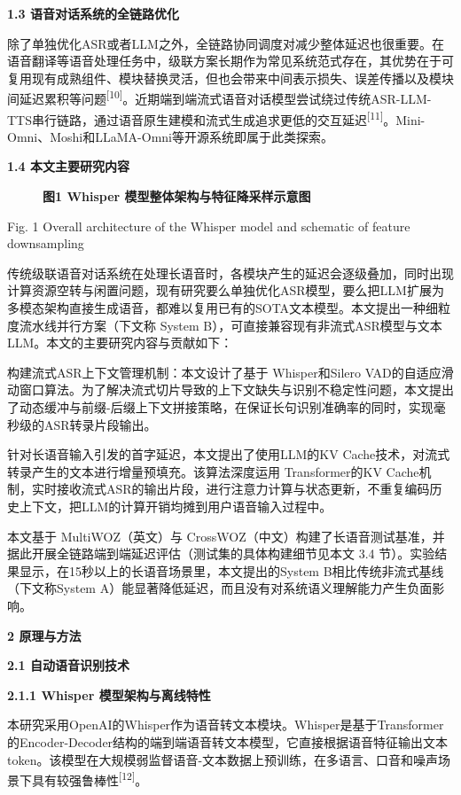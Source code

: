 \documentclass[
]{article}
\begin{document}
\textbf{1.3 语音对话系统的全链路优化}

除了单独优化ASR或者LLM之外，全链路协同调度对减少整体延迟也很重要。在语音翻译等语音处理任务中，级联方案长期作为常见系统范式存在，其优势在于可复用现有成熟组件、模块替换灵活，但也会带来中间表示损失、误差传播以及模块间延迟累积等问题\textsuperscript{{[}10{]}}。近期端到端流式语音对话模型尝试绕过传统ASR-LLM-TTS串行链路，通过语音原生建模和流式生成追求更低的交互延迟\textsuperscript{{[}11{]}}。Mini-Omni、Moshi和LLaMA-Omni等开源系统即属于此类探索。

\textbf{1.4 本文主要研究内容}

\begin{figure}
\centering

\caption{\textbf{图1 Whisper 模型整体架构与特征降采样示意图}}
\end{figure}

Fig. 1 Overall architecture of the Whisper model and schematic of feature downsampling

传统级联语音对话系统在处理长语音时，各模块产生的延迟会逐级叠加，同时出现计算资源空转与闲置问题，现有研究要么单独优化ASR模型，要么把LLM扩展为多模态架构直接生成语音，都难以复用已有的SOTA文本模型。本文提出一种细粒度流水线并行方案（下文称 System B），可直接兼容现有非流式ASR模型与文本LLM。本文的主要研究内容与贡献如下：

构建流式ASR上下文管理机制：本文设计了基于 Whisper和Silero VAD的自适应滑动窗口算法。为了解决流式切片导致的上下文缺失与识别不稳定性问题，本文提出了动态缓冲与前缀-后缀上下文拼接策略，在保证长句识别准确率的同时，实现毫秒级的ASR转录片段输出。

针对长语音输入引发的首字延迟，本文提出了使用LLM的KV Cache技术，对流式转录产生的文本进行增量预填充。该算法深度运用 Transformer的KV Cache机制，实时接收流式ASR的输出片段，进行注意力计算与状态更新，不重复编码历史上下文，把LLM的计算开销均摊到用户语音输入过程中。

本文基于 MultiWOZ（英文）与 CrossWOZ（中文）构建了长语音测试基准，并据此开展全链路端到端延迟评估（测试集的具体构建细节见本文 3.4 节）。实验结果显示，在15秒以上的长语音场景里，本文提出的System B相比传统非流式基线（下文称System A）能显著降低延迟，而且没有对系统语义理解能力产生负面影响。

\textbf{2 原理与方法}

\textbf{2.1 自动语音识别技术}

\textbf{2.1.1 Whisper 模型架构与离线特性}

本研究采用OpenAI的Whisper作为语音转文本模块。Whisper是基于Transformer的Encoder-Decoder结构的端到端语音转文本模型，它直接根据语音特征输出文本token。该模型在大规模弱监督语音-文本数据上预训练，在多语言、口音和噪声场景下具有较强鲁棒性\textsuperscript{{[}12{]}}。
\end{document}
